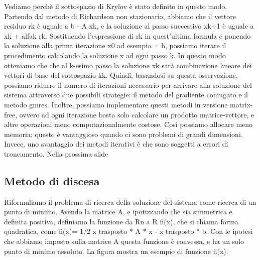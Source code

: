 \documentclass[a4paper]{article}
\begin{document}
Vediamo perchè il sottospazio di Krylov è stato definito in questo modo. Partendo dal metodo di Richardson non stazionario, abbiamo che il vettore residuo rk è uguale a b - A xk, e la soluzione al passo successivo xk+1 è uguale a xk + alfak rk. Sostituendo l'espressione di rk in quest'ultima formula e ponendo la soluzione alla prima iterazione x0 ad esempio = b, possiamo iterare il procedimento calcolando la soluzione x ad ogni passo k.
In questo modo otteniamo che che al k-esimo passo la soluzione xk sarà combinazione lineare dei vettori di base del sottospazio kk.
Quindi, basandosi su questa osservazione, possiamo ridurre il numero di iterazioni necessario per arrivare alla soluzione del sistema attraverso due possibili strategie: il metodo del gradiente coniugato e il metodo gmres.
Inoltre, possiamo implementare questi metodi in versione matrix-free, ovvero ad ogni iterazione basta solo calcolare un prodotto matrice-vettore, e altre operazioni meno computazionalmente costose. Così possiamo allocare meno memoria: questo è vantaggioso quando ci sono problemi di grandi dimensioni. Invece, uno svantaggio dei metodi iterativi è che sono soggetti a errori di troncamento. Nella prossima slide


\subsection*{Metodo di discesa}
Riformuliamo il problema di ricerca della soluzione del sistema come ricerca di un punto di minimo. Avendo la matrice A, e ipotizzando che sia simmetrica e definita positiva, definiamo la funzione da Rn a R fi(x), che si chiama forma quadratica, come fi(x)= 1/2 x trasposto * A * x - x trasposto * b. Con le ipotesi che abbiamo imposto sulla matrice A questa funzione è convessa, e ha un solo punto di minimo assoluto. La figura mostra un esempio di funzione fi(x).
\end{document}
